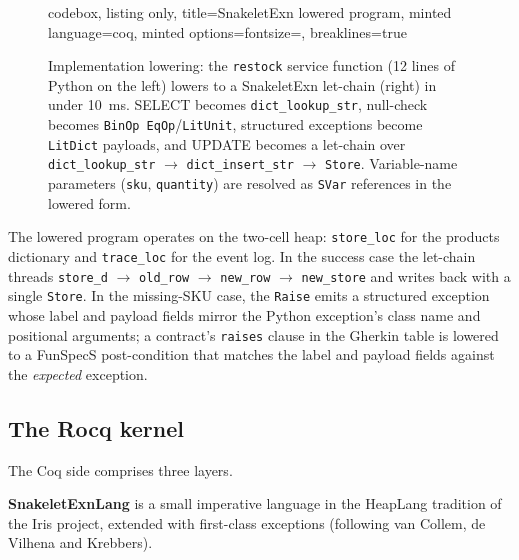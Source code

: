 \documentclass[11pt,a4paper]{article}
\begin{document}
\begin{figure}[t]
\begin{tcbraster}[raster columns=2, raster equal height,
  raster column skip=3mm, raster force size=false]
\begin{tcblisting}{codebox, listing only,
  title={\footnotesize SnakeletExn lowered program},
  minted language=coq,
  minted options={fontsize=\fontsize{7}{8}\selectfont, breaklines=true}}
\end{tcblisting}
\end{tcbraster}
\caption{Implementation lowering: the \texttt{restock} service function
(12 lines of Python on the left) lowers to a SnakeletExn let-chain
(right) in under 10~ms.  SELECT becomes \texttt{dict\_lookup\_str},
null-check becomes \texttt{BinOp EqOp}/\texttt{LitUnit}, structured
exceptions become \texttt{LitDict} payloads, and UPDATE becomes a
let-chain over \texttt{dict\_lookup\_str} $\to$ \texttt{dict\_insert\_str}
$\to$ \texttt{Store}.  Variable-name parameters (\texttt{sku},
\texttt{quantity}) are resolved as \texttt{SVar} references in the
lowered form.}
\label{fig:restock-lowering}
\end{figure}

The lowered program operates on the two-cell heap:
\texttt{store\_loc} for the products dictionary and
\texttt{trace\_loc} for the event log.  In the success case the
let-chain threads \texttt{store\_d} $\to$ \texttt{old\_row} $\to$
\texttt{new\_row} $\to$ \texttt{new\_store} and writes back with a
single \texttt{Store}.  In the missing-SKU case, the \texttt{Raise}
emits a structured exception whose label and payload fields mirror the
Python exception's class name and positional arguments; a contract's
\texttt{raises} clause in the Gherkin table is lowered to a FunSpecS
post-condition that matches the label and payload fields against the
\emph{expected} exception.

\subsection{The Rocq kernel}

The Coq side comprises three layers.

\newcommand{\synsep}{\;\mid\;}

\textbf{SnakeletExnLang} is a small imperative language in the
HeapLang tradition of the Iris project, extended with first-class
exceptions (following van Collem, de Vilhena and Krebbers).
\end{document}
